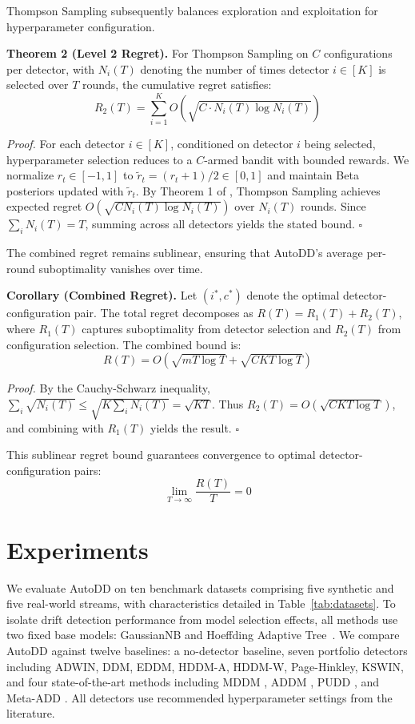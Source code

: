 \documentclass{article}
\begin{document}
Thompson Sampling subsequently balances exploration and exploitation for hyperparameter configuration.

\textbf{Theorem 2 (Level 2 Regret).} For Thompson Sampling on $C$ configurations per detector, with $N_i(T)$ denoting the number of times detector $i \in [K]$ is selected over $T$ rounds, the cumulative regret satisfies:
\begin{equation}
R_2(T) = \sum_{i=1}^{K} O(\sqrt{C \cdot N_i(T) \log N_i(T)})
\end{equation}

\textit{Proof.} For each detector $i \in [K]$, conditioned on detector $i$ being selected, hyperparameter selection reduces to a $C$-armed bandit with bounded rewards. We normalize $r_t \in [-1,1]$ to $\tilde{r}_t = (r_t+1)/2 \in [0,1]$ and maintain Beta posteriors updated with $\tilde{r}_t$. By Theorem 1 of \cite{Agrawal2013Further}, Thompson Sampling achieves expected regret $O(\sqrt{CN_i(T)\log N_i(T)})$ over $N_i(T)$ rounds. Since $\sum_i N_i(T) = T$, summing across all detectors yields the stated bound. \hfill $\square$

The combined regret remains sublinear, ensuring that AutoDD's average per-round suboptimality vanishes over time.

\textbf{Corollary (Combined Regret).} Let $(i^*, c^*)$ denote the optimal detector-configuration pair. The total regret decomposes as $R(T) = R_1(T) + R_2(T)$, where $R_1(T)$ captures suboptimality from detector selection and $R_2(T)$ from configuration selection. The combined bound is:
\begin{equation}
R(T) = O(\sqrt{mT \log T} + \sqrt{CKT \log T})
\end{equation}

\textit{Proof.} By the Cauchy-Schwarz inequality, $\sum_i \sqrt{N_i(T)} \leq \sqrt{K \sum_i N_i(T)} = \sqrt{KT}$. Thus $R_2(T) = O(\sqrt{CKT\log T})$, and combining with $R_1(T)$ yields the result. \hfill $\square$

This sublinear regret bound guarantees convergence to optimal detector-configuration pairs:
\begin{equation}
\lim_{T \to \infty} \frac{R(T)}{T} = 0
\end{equation}

\section{Experiments}
\label{sec:experiments}

We evaluate AutoDD on ten benchmark datasets comprising five synthetic and five real-world streams, with characteristics detailed in Table~\ref{tab:datasets}. To isolate drift detection performance from model selection effects, all methods use two fixed base models: GaussianNB and Hoeffding Adaptive Tree~\cite{domingos2000mining}. We compare AutoDD against twelve baselines: a no-detector baseline, seven portfolio detectors including ADWIN, DDM, EDDM, HDDM-A, HDDM-W, Page-Hinkley, KSWIN, and four state-of-the-art methods including MDDM \cite{Pesaranghader2017MDDM}, ADDM \cite{Mayaki2022ADDM}, PUDD \cite{Lu2025PUDD}, and Meta-ADD \cite{Yu2021MetaADD}. All detectors use recommended hyperparameter settings from the literature.
\end{document}
